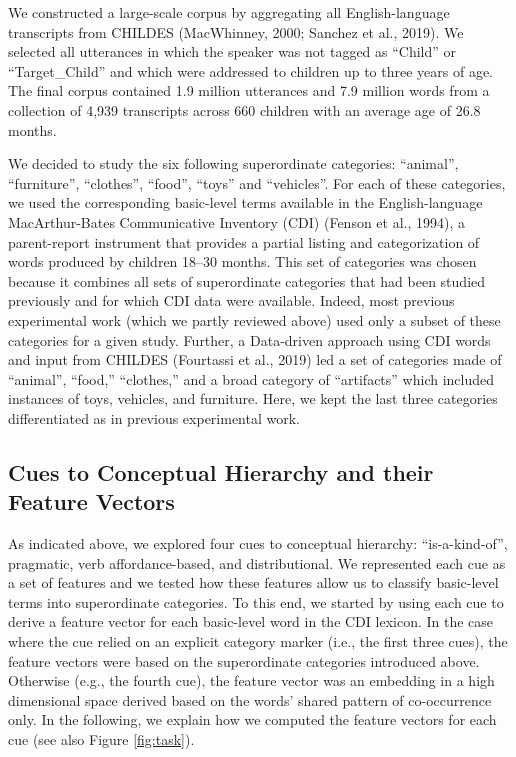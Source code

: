 \documentclass[english,,man,floatsintext]{apa6}
\begin{document}
We constructed a large-scale corpus by aggregating all English-language transcripts from CHILDES (MacWhinney, 2000; Sanchez et al., 2019). We selected all utterances in which the speaker was not tagged as \enquote{Child} or \enquote{Target\_Child} and which were addressed to children up to three years of age. The final corpus contained 1.9 million utterances and 7.9 million words from a collection of 4,939 transcripts across 660 children with an average age of 26.8 months.

We decided to study the six following superordinate categories: \enquote{animal}, \enquote{furniture}, \enquote{clothes}, \enquote{food}, \enquote{toys} and \enquote{vehicles}. For each of these categories, we used the corresponding basic-level terms available in the English-language MacArthur-Bates Communicative Inventory (CDI) (Fenson et al., 1994), a parent-report instrument that provides a partial listing and categorization of words produced by children 18--30 months. This set of categories was chosen because it combines all sets of
superordinate categories that had been studied previously and for which CDI data were available. Indeed, most previous experimental work (which we partly reviewed above) used only a subset of these categories for a given study. Further, a Data-driven approach using CDI words and input from CHILDES (Fourtassi et al., 2019) led a set of categories made of \enquote{animal}, \enquote{food,} \enquote{clothes,} and a broad category of \enquote{artifacts} which included instances of toys, vehicles, and furniture. Here, we kept the last three categories differentiated as in previous experimental work.

\hypertarget{cues-to-conceptual-hierarchy-and-their-feature-vectors}{%
\subsection{Cues to Conceptual Hierarchy and their Feature Vectors}\label{cues-to-conceptual-hierarchy-and-their-feature-vectors}}

As indicated above, we explored four cues to conceptual hierarchy: \enquote{is-a-kind-of}, pragmatic, verb affordance-based, and distributional.
We represented each cue as a set of features and we tested how these features allow us to classify basic-level terms into superordinate
categories. To this end, we started by using each cue to derive a feature vector for each basic-level word in the CDI lexicon. In the case where the cue relied on an explicit category marker (i.e., the first three cues), the feature vectors were based on the superordinate categories introduced above. Otherwise (e.g., the fourth cue), the feature vector was an embedding in a high dimensional space derived based on the words' shared pattern of co-occurrence only. In the following, we explain how we computed the feature vectors for each cue (see also Figure \ref{fig:task}).
\end{document}
